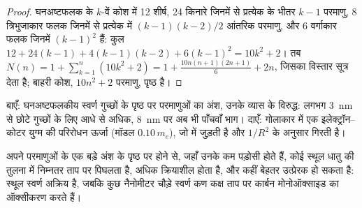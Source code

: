 \begin{proof}
घनअष्टफलक के $k$-वें कोश में 12 शीर्ष, 24 किनारे जिनमें से प्रत्येक के भीतर $k - 1$ परमाणु,
8 त्रिभुजाकार फलक जिनमें से प्रत्येक में $(k - 1)(k - 2)/2$ आंतरिक परमाणु, और 6
वर्गाकार फलक जिनमें $(k - 1)^2$ हैं: कुल $12 + 24(k - 1) + 4(k - 1)(k - 2) + 6(k - 1)^2 = 10k^2 + 2$। तब
$N(n) = 1 + \sum_{k=1}^{n}(10k^2 + 2) = 1 + \frac{10n(n + 1)(2n + 1)}{6} + 2n$, जिसका विस्तार सूत्र देता है;
बाहरी कोश, $10n^2 + 2$ परमाणु, पृष्ठ है।
\end{proof}

\begin{omfigure}

{\small बाएँ: घनअष्टफलकीय स्वर्ण गुच्छों के पृष्ठ पर परमाणुओं का अंश,
उनके व्यास के विरुद्ध: लगभग \qty{3}{nm} से छोटे गुच्छों के लिए आधे से अधिक,
\qty{8}{nm} पर अब भी पाँचवाँ भाग। दाएँ: गोलाकार  में एक
इलेक्ट्रॉन--कोटर युग्म की परिरोधन ऊर्जा (मॉडल  $0.10\,m_e$),
जो  में जुड़ती है और $1/R^2$ के अनुसार गिरती है।}
\end{omfigure}

अपने परमाणुओं के एक बड़े अंश के पृष्ठ पर होने से, जहाँ उनके कम
पड़ोसी होते हैं, कोई  स्थूल धातु की तुलना में निम्नतर ताप पर पिघलता है,
अधिक क्रियाशील होता है, और कहीं बेहतर उत्प्रेरक हो सकता है: स्थूल स्वर्ण अक्रिय है, जबकि
कुछ नैनोमीटर चौड़े स्वर्ण कण कक्ष ताप पर कार्बन मोनोऑक्साइड का ऑक्सीकरण करते हैं।

